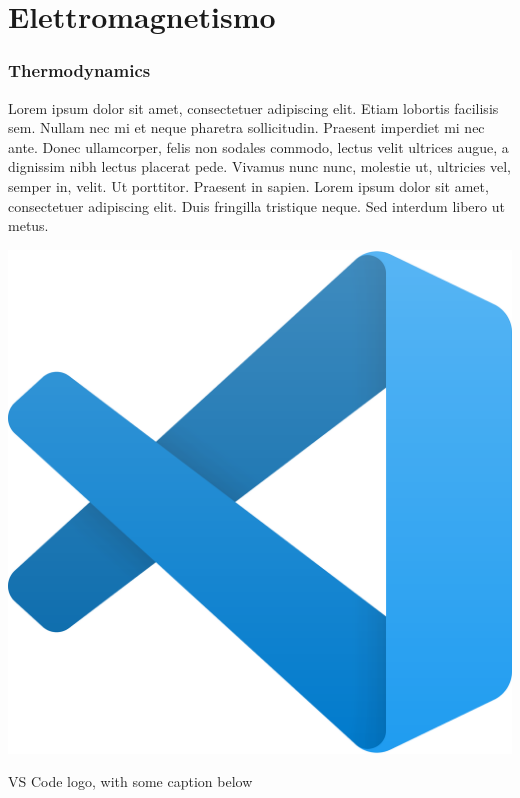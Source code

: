 \documentclass{book}
\begin{document}
\part{Elettromagnetismo}








\section{Thermodynamics}
\marginpar{\minitoc}


Lorem ipsum dolor sit amet, consectetuer adipiscing elit. Etiam lobortis facilisis
sem. Nullam nec mi et neque pharetra sollicitudin. Praesent imperdiet mi nec
ante. Donec ullamcorper, felis non sodales commodo, lectus velit ultrices augue,
a dignissim nibh lectus placerat pede. Vivamus nunc nunc, molestie ut, ultricies
vel, semper in, velit. Ut porttitor. Praesent in sapien. Lorem ipsum dolor sit
amet, consectetuer adipiscing elit. Duis fringilla tristique neque. Sed interdum
libero ut metus. 


\begin{marginfigure}
  \centering
  \includegraphics[width = \marginparwidth]{figures/vscode.png}
  \caption{VS Code logo, with some caption below}
\end{marginfigure}
\end{document}
